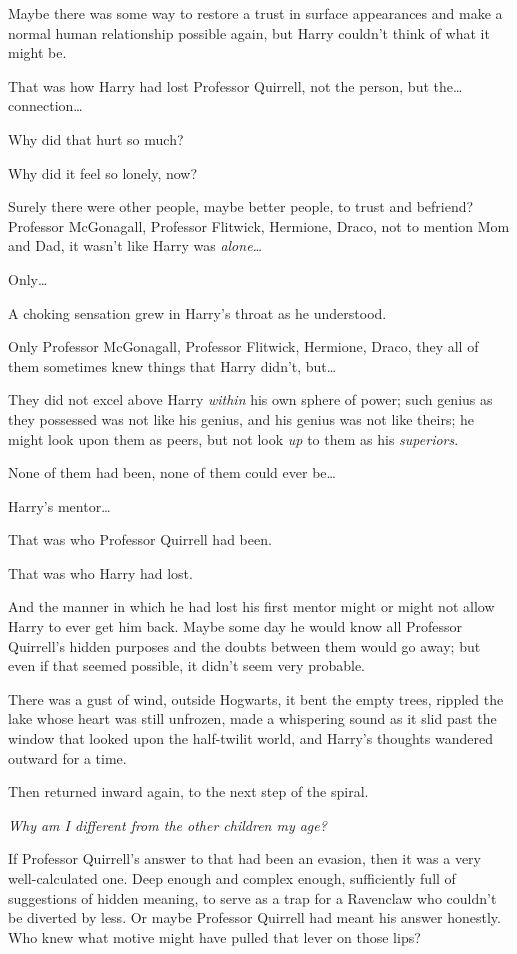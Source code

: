 Maybe there was some way to restore a trust in surface appearances and make a normal human relationship possible again, but Harry couldn't think of what it might be.

That was how Harry had lost Professor Quirrell, not the person, but the{\ldots} connection{\ldots}

Why did that hurt so much?

Why did it feel so lonely, now?

Surely there were other people, maybe better people, to trust and befriend? Professor McGonagall, Professor Flitwick, Hermione, Draco, not to mention Mom and Dad, it wasn't like Harry was \emph{alone{\ldots}}

Only{\ldots}

A choking sensation grew in Harry's throat as he understood.

Only Professor McGonagall, Professor Flitwick, Hermione, Draco, they all of them sometimes knew things that Harry didn't, but{\ldots}

They did not excel above Harry \emph{within} his own sphere of power; such genius as they possessed was not like his genius, and his genius was not like theirs; he might look upon them as peers, but not look \emph{up} to them as his \emph{superiors}.

None of them had been, none of them could ever be{\ldots}

Harry's mentor{\ldots}

That was who Professor Quirrell had been.

That was who Harry had lost.

And the manner in which he had lost his first mentor might or might not allow Harry to ever get him back. Maybe some day he would know all Professor Quirrell's hidden purposes and the doubts between them would go away; but even if that seemed possible, it didn't seem very probable.

There was a gust of wind, outside Hogwarts, it bent the empty trees, rippled the lake whose heart was still unfrozen, made a whispering sound as it slid past the window that looked upon the half-twilit world, and Harry's thoughts wandered outward for a time.

Then returned inward again, to the next step of the spiral.

\emph{Why am I different from the other children my age?}

If Professor Quirrell's answer to that had been an evasion, then it was a very well-calculated one. Deep enough and complex enough, sufficiently full of suggestions of hidden meaning, to serve as a trap for a Ravenclaw who couldn't be diverted by less. Or maybe Professor Quirrell had meant his answer honestly. Who knew what motive might have pulled that lever on those lips?

